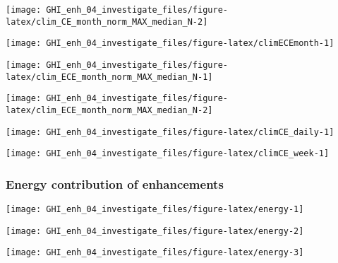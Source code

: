 \documentclass[
  10pt,
  a4paper,oneside]{article}
\begin{document}
\begin{center}\texttt{[image: GHI\_enh\_04\_investigate\_files/figure-latex/clim\_CE\_month\_norm\_MAX\_median\_N-2]} \end{center}

\begin{center}\texttt{[image: GHI\_enh\_04\_investigate\_files/figure-latex/climECEmonth-1]} \end{center}

\begin{center}\texttt{[image: GHI\_enh\_04\_investigate\_files/figure-latex/clim\_ECE\_month\_norm\_MAX\_median\_N-1]} \end{center}

\begin{center}\texttt{[image: GHI\_enh\_04\_investigate\_files/figure-latex/clim\_ECE\_month\_norm\_MAX\_median\_N-2]} \end{center}

\begin{center}\texttt{[image: GHI\_enh\_04\_investigate\_files/figure-latex/climCE\_daily-1]} \end{center}

\begin{center}\texttt{[image: GHI\_enh\_04\_investigate\_files/figure-latex/climCE\_week-1]} \end{center}

\newpage
\FloatBarrier

\hypertarget{energy-contribution-of-enhancements}{%
\subsubsection{Energy contribution of enhancements}\label{energy-contribution-of-enhancements}}

\begin{center}\texttt{[image: GHI\_enh\_04\_investigate\_files/figure-latex/energy-1]} \end{center}

\begin{center}\texttt{[image: GHI\_enh\_04\_investigate\_files/figure-latex/energy-2]} \end{center}

\begin{center}\texttt{[image: GHI\_enh\_04\_investigate\_files/figure-latex/energy-3]} \end{center}
\end{document}
